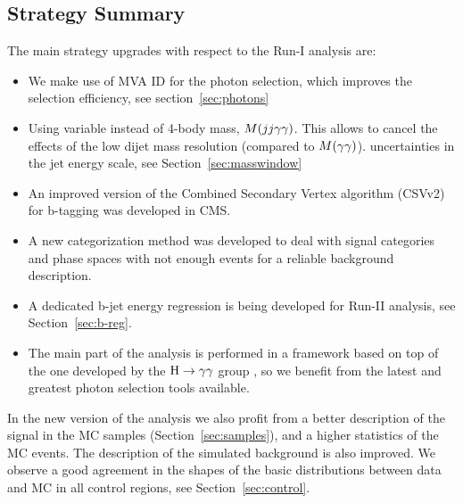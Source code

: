 
\subsection{Strategy Summary}

The main strategy upgrades with respect to the Run-I analysis are:
\begin{itemize}
\item We make use of MVA ID for the photon selection, which improves the selection
  efficiency, see section~\ref{sec:photons}
\item Using \Mtilde variable instead of 4-body mass, $M(jj\gamma\gamma)$. This allows to cancel the
  effects of the low dijet mass resolution (compared to $M(\gamma\gamma)$).
  uncertainties in the jet energy scale, see Section~\ref{sec:masswindow}
\item An improved version of the Combined Secondary Vertex algorithm (CSVv2) for b-tagging
  was developed in CMS.
\item A new categorization method was developed to deal with signal categories and phase spaces 
with not enough events for a reliable background description.
\item A dedicated b-jet energy regression is being developed for Run-II analysis, see
  Section~\ref{sec:b-reg}.
\item The main part of the analysis is performed in a framework based on top of the one developed
 by the $\mathrm{H}\to\gamma\gamma$ group \cite{flashgg-twiki}, so we benefit from the latest and greatest photon selection tools
  available.
\end{itemize}
In the new version of the analysis we also profit from a better description of the signal in the MC
samples (Section~\ref{sec:samples}), and a higher statistics of the MC events. The
description of the simulated background is also improved. We observe a good agreement in
the shapes of the basic distributions between data and MC in all control regions, see
Section~\ref{sec:control}.

